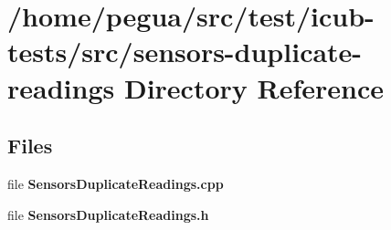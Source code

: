 \section{/home/pegua/src/test/icub-\/tests/src/sensors-\/duplicate-\/readings Directory Reference}
\label{dir_6fc1adc4fe0a69d5cc9f87dc6006118e}
\subsection*{Files}
\begin{DoxyCompactItemize}
\item 
file {\bfseries Sensors\-Duplicate\-Readings.\-cpp}
\item 
file {\bfseries Sensors\-Duplicate\-Readings.\-h}
\end{DoxyCompactItemize}
